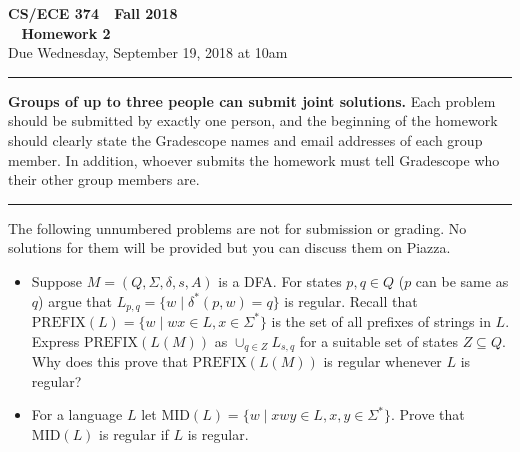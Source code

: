 \documentclass[11pt]{article}
\begin{document}

\thispagestyle{empty}

\begin{center}
\Large\textbf{CS/ECE 374 \,\decosix\,  Fall 2018}%
\\
\LARGE\textbf{\decothreeleft~ Homework 2 ~\decothreeright}%
\\[0.5ex]
\large Due Wednesday, September 19, 2018 at 10am
\end{center}

\bigskip
\hrule
\bigskip

\noindent
\textbf{Groups of up to three people can submit joint solutions.}  Each problem should be submitted by exactly one person, and the beginning of the homework should clearly state the Gradescope names and email addresses of each group member.  In addition, whoever submits the homework must tell Gradescope who their other group members are.
\bigskip
\hrule
\bigskip


\noindent
The following unnumbered problems are not for submission or grading.
No solutions for them will be provided but you can discuss them on Piazza.
\begin{itemize}
\item Suppose $M = (Q,\Sigma,\delta,s,A)$ is a DFA.  For states $p,q
  \in Q$ ($p$ can be same as $q$) argue that $L_{p,q} = \{w \mid
  \delta^*(p,w) = q\}$ is regular.  Recall that $\text{PREFIX}(L) = \{
  w \mid wx \in L, x \in \Sigma^*\}$ is the set of all prefixes of
  strings in $L$. Express $\text{PREFIX}(L(M))$ as
  $\cup_{q \in Z} L_{s,q}$ for a suitable set of states $Z \subseteq Q$.
  Why does this prove that $\text{PREFIX}(L(M))$ is regular whenever $L$ is
  regular?

\item For a language $L$ let $\text{MID}(L) = \{ w \mid xwy \in L, x,
  y \in \Sigma^* \}$. Prove that $\text{MID}(L)$ is regular if
  $L$ is regular.
\end{itemize}

\vspace{1cm}
\end{document}
